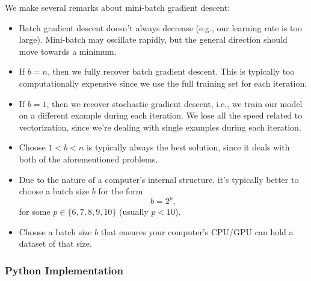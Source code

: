 We make several remarks about mini-batch gradient descent:
\begin{itemize}
	\item Batch gradient descent doesn't always decrease (e.g., our learning rate is too large).  Mini-batch may oscillate rapidly, but the general direction should move towards a minimum.
	\item If $b=n$, then we fully recover batch gradient descent.  This is typically too computationally expensive since we use the full training set for each iteration.
	\item If $b=1$, then we recover stochastic gradient descent, i.e., we train our model on a different example during each iteration.  We lose all the speed related to vectorization, since we're dealing with single examples during each iteration.
	\item Choose $1<b<n$ is typically always the best solution, since it deals with both of the aforementioned problems.
	\item Due to the nature of a computer's internal structure, it's typically better to choose a batch size $b$ for the form
		$$b=2^p,$$
		for some $p\in\{6,7,8,9,10\}$ (usually $p<10$).
	\item Choose a batch size $b$ that ensures your computer's CPU/GPU can hold a dataset of that size.
\end{itemize}


\subsubsection{Python Implementation}



